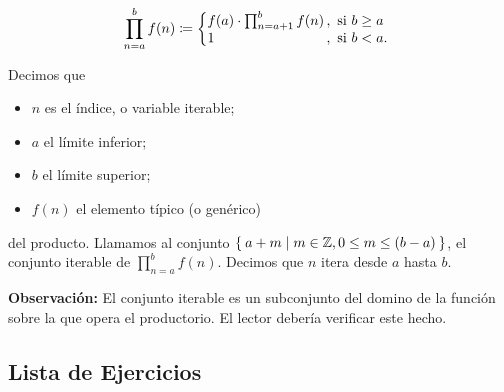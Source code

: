 \[
    \prod_{n=a}^{b} f(n) \defined \left\{
    \begin{array}{@{}l@{\thinspace}l}
    f(a) \cdot \prod_{n=a+1}^{b} f(n) &,  \ \text{si}  \ b\geq a\\
    1 &,  \ \text{si}  \ b<a.
    \end{array} \right. \]

Decimos que
\vspace{-1em}\begin{itemize}
  \item $n$ es el índice, o variable iterable;
  \item $a$ el límite inferior;
  \item $b$ el límite superior;
  \item $f(n)$ el elemento típico (o genérico)
\end{itemize}\vspace{-1em}
del producto. Llamamos al conjunto $\Set{a + m | m\in \mathbb{Z}, 0\leq m \leq (b-a)}$, el conjunto iterable de $\prod_{n=a}^{b} f(n)$. Decimos que $n$ itera desde $a$ hasta $b$.

\textbf{Observación:} El conjunto iterable es un subconjunto del domino de la función sobre la que opera el productorio. El lector debería verificar este hecho.

\subsection*{Lista de Ejercicios}

